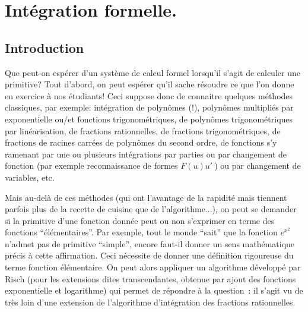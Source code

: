 \documentclass[a4paper,11pt]{article}
\begin{document}
\begin{giacjshere}
\begin{enumerate}
\end{enumerate}

\pagebreak

\section{Int\'egration formelle.}\label{sec:intg} 
\subsection{Introduction}
Que peut-on espérer d'un système de calcul formel lorsqu'il s'agit
de calculer une primitive? Tout d'abord, on peut espérer qu'il
sache résoudre ce que l'on donne en exercice à nos étudiants!
Ceci suppose donc de connaitre quelques méthodes classiques, par
exemple: intégration de polynômes (!), polynômes multipliés par exponentielle
ou/et fonctions trigonométriques, de polynômes trigonométriques par
linéarisation, de fractions rationnelles,
de fractions trigonométriques, de fractions de racines carrées de 
polynômes du second ordre, de fonctions s'y ramenant par une ou plusieurs
intégrations par parties ou par
changement de fonction (par exemple reconnaissance de formes $F(u)u'\ $)
ou par changement de variables, etc.

Mais au-delà de ces méthodes (qui ont l'avantage de la rapidité mais
tiennent parfois plus de la
recette de cuisine que de l'algorithme...), on peut se demander 
si la primitive d'une fonction donnée peut ou non s'exprimer en terme 
des fonctions ``élémentaires''. Par exemple, tout le monde ``sait''
que la fonction $e^{x^2}$ n'admet pas de primitive ``simple'', encore
faut-il donner un sens mathématique précis à cette affirmation.
Ceci nécessite de donner une définition rigoureuse du terme fonction
élémentaire. On peut alors appliquer un algorithme développé
par Risch (pour les extensions dites transcendantes, obtenue par ajout
des fonctions exponentielle et logarithme)  
qui permet de répondre à la question~:
il s'agit vu de très loin d'une extension de l'algorithme d'intégration
des fractions rationnelles.


\end{giacjshere}
\end{document}
